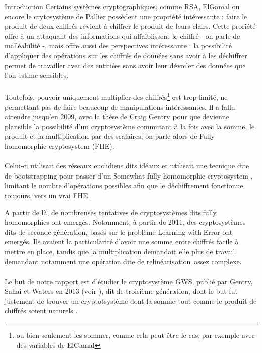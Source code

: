 \begin{section}{Introduction}
	Certains systèmes cryptographiques, comme RSA, ElGamal ou encore le crytosystème de Pallier possèdent une propriété intéressante : faire le produit de deux chiffrés revient à chiffrer le produit de leurs clairs. Cette proriété offre à un attaquant des informations qui affaiblissent le chiffré - on parle de malléabilité -, mais offre aussi des perspectives intéressante : la possibilité d'appliquer des opérations sur les chiffrés de données sans avoir à les déchiffrer permet de travailler avec des entitiées sans avoir leur dévoiler des données que l'on estime sensibles.

	\paragraph{}
	Toutefois, pouvoir uniquement multiplier des chiffrés\footnote{ou bien seulement les sommer, comme cela peut être le cas, par exemple avec des variables de ElGamal} est trop limité, ne permettant pas de faire beaucoup de manipulations intéressantes. Il a fallu attendre jusqu'en 2009, avec la thèse de Craig Gentry \cite{gentry_thesis} pour que devienne plausible la possibilité d'un cryptosystème \og commutant \fg à la fois avec la somme, le produit et la multiplication par des scalaires; on parle alors de \og Fully homomorphic cryptosystem \fg (FHE).

	\paragraph{}
	Celui-ci utilisait des réseaux euclidiens dits \og idéaux \fg et utilisait une tecnique dite de \og bootstrapping \fg pour passer d'un \og Somewhat fully homomorphic cryptosystem \fg, limitant le nombre d'opérations possibles afin que le déchiffrement fonctionne toujours, vers un vrai FHE.

	A partir de là, de nombreuses tentatives de cryptosystèmes dits \og fully homomorphics \fg ont emergés. Notamment, à partir de 2011, des cryptosystèmes dits de seconde	génération, basés sur le problème Learning with Error ont emergés. Ils avaient la particularité d'avoir une somme entre chiffrés facile à mettre en place, tandis que la multiplication demandait elle plus de travail, demandant notamment une opération dite de \og relinéarisation \fg assez complexe.

	\paragraph{}
	Le but de notre rapport est d'étudier le cryptosystème GWS, publié par Gentry, Sahai et Waters en 2013 (voir \cite{EPRINT:GenSahWat13}), dit de troisième génération, dont le but fut justement de trouver un cryptotsystème dont la somme tout comme le produit de chiffrés soient \og naturels \fg.


\end{section}
